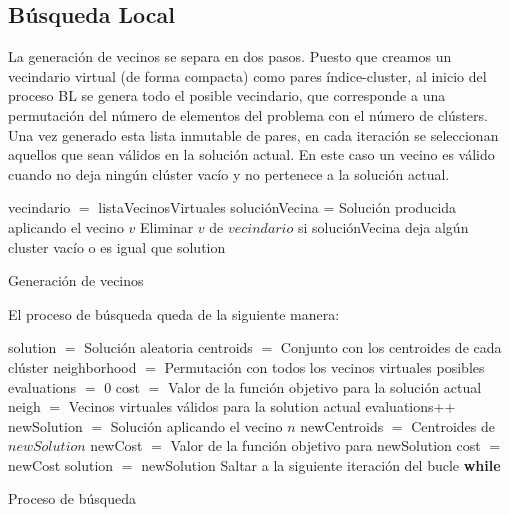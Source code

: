 
\newpage

\subsection{Búsqueda Local}

La generación de vecinos se separa en dos pasos. Puesto que creamos un vecindario virtual (de forma compacta) como pares índice-cluster, al inicio del proceso BL se genera todo el posible vecindario, que corresponde a una permutación del número de elementos del problema con el número de clústers.
Una vez generado esta lista inmutable de pares, en cada iteración se seleccionan aquellos que sean válidos en la solución actual. En este caso un vecino es válido cuando no deja ningún clúster vacío y no pertenece a la solución actual. \\

\begin{algorithm}[H]
    \SetAlgoLined
        vecindario $=$ listaVecinosVirtuales \;
         {
            soluciónVecina = Solución producida aplicando el vecino $v$ \;
            Eliminar $v$ de $vecindario$ si soluciónVecina deja algún cluster vacío o es igual que solution \;
        }
    \caption{Generación de vecinos}
\end{algorithm}

\vspace{\baselineskip}

El proceso de búsqueda queda de la siguiente manera: \\

\begin{algorithm}[H]
    \SetAlgoLined
        solution $=$ Solución aleatoria \;
        centroids $=$ Conjunto con los centroides de cada clúster \;
        neighborhood $=$ Permutación con todos los vecinos virtuales posibles \;
        evaluations $=$ 0 \;
        cost $=$ Valor de la función objetivo para la solución actual \;
         {
            neigh $=$ Vecinos virtuales válidos para la solution actual \;
             {
                evaluations++ \;
                newSolution $=$ Solución aplicando el vecino $n$ \;
                newCentroids $=$ Centroides de $newSolution$ \;
                newCost $=$ Valor de la función objetivo para newSolution \;
                 {
                    cost $=$ newCost \;
                    solution $=$ newSolution \;
                    Saltar a la siguiente iteración del bucle \textbf{while} \;
                }
            }
        }
    \caption{Proceso de búsqueda}
\end{algorithm}

